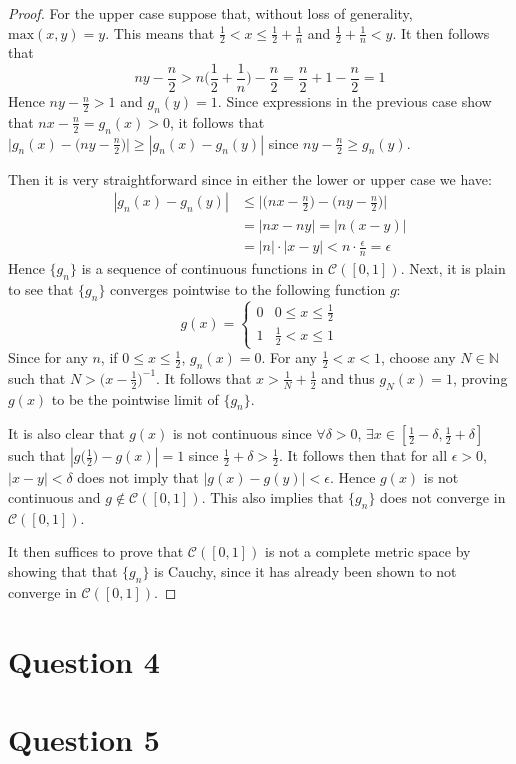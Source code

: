 \documentclass[12pt, letterpaper]{article}
\begin{document}
\begin{proof}
  For the upper case suppose that, without loss of generality, $\text{max}(x,y) = y$. This means that $\frac{1}{2} < x \leq \frac{1}{2} + \frac{1}{n}$ and $\frac{1}{2} + \frac{1}{n} < y$. It then follows that
  $$ ny - \frac{n}{2} > n\bigg(\frac{1}{2} + \frac{1}{n}\bigg) - \frac{n}{2} = \frac{n}{2} + 1 - \frac{n}{2} = 1$$
  Hence $ny - \frac{n}{2} > 1$ and $g_n(y) = 1$. Since expressions in the previous case show that $nx - \frac{n}{2} = g_n(x) > 0 $, it follows that $\big|g_n(x) - \big(ny - \frac{n}{2}\big)\big| \geq |g_n(x) - g_n(y)|$ since $ny - \frac{n}{2} \geq g_n(y)$.

  Then it is very straightforward since in either the lower or upper case we have:
  \begin{align*}
    |g_n(x) - g_n(y)| &\leq \Big|\Big(nx - \frac{n}{2}\Big) - \Big(ny - \frac{n}{2}\Big)\Big|\\
    &= |nx - ny| = |n(x-y)|\\
    &= |n|\cdot|x-y| < n\cdot\frac{\epsilon}{n} = \epsilon
  \end{align*}
  Hence $\{g_n\}$ is a sequence of continuous functions in $\mathcal{C}([0,1])$. Next, it is plain to see that $\{g_n\}$ converges pointwise to the following function $g$:
  \[
  g(x) =
  \begin{cases}
      0 & 0 \leq x \leq \frac{1}{2} \\
      1 & \frac{1}{2} < x \leq 1
   \end{cases}
  \]
  Since for any $n$, if $0 \leq x \leq \frac{1}{2}$, $g_n(x) = 0$. For any $\frac{1}{2} < x < 1$, choose any $N \in \mathbb{N}$ such that $N > \big(x - \frac{1}{2}\big)^{-1}$. It follows that $x > \frac{1}{N} + \frac{1}{2}$ and thus $g_N(x) = 1$, proving $g(x)$ to be the pointwise limit of $\{g_n\}$.
  \par It is also clear that $g(x)$ is not continuous since $\forall \delta > 0$, $\exists x \in [\frac{1}{2} - \delta, \frac{1}{2} + \delta]$ such that $|g\big(\frac{1}{2}\big) - g(x)| = 1$ since $\frac{1}{2} + \delta > \frac{1}{2}$. It follows then that for all $\epsilon > 0$, $|x - y| < \delta$ does not imply that $|g(x) - g(y)| < \epsilon$. Hence $g(x)$ is not continuous and $g \notin \mathcal{C}([0,1])$. This also implies that $\{g_n\}$ does not converge in $\mathcal{C}([0,1])$.
  \par It then suffices to prove that $\mathcal{C}([0,1])$ is not a complete metric space by showing that that $\{g_n\}$ is Cauchy, since it has already been shown to not converge in $\mathcal{C}([0,1])$.
\end{proof}
\section*{Question 4}
\section*{Question 5}
\end{document}
